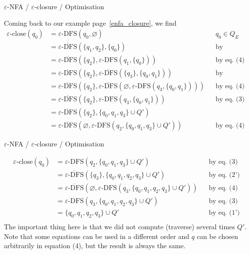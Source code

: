 \documentclass[compress,dvips,xcolor={dvipsnames},t]{beamer}
\newcommand\eNFA{\(\varepsilon\)-NFA\xspace}
\newcommand\eClose{\varepsilon\text{-close}}
\newcommand\eDFS{\varepsilon\text{-DFS}}
\newcommand\eDFSset{\overline{\varepsilon\text{-DFS}}}
\begin{document}
%
\begin{frame}{\eNFA{} / \(\varepsilon\)-closure / Optimisation}

Coming back to our example page~\ref{enfa_closure}, we find
\begin{align*}
   \eClose (q_0)
&= \eDFS (q_0, \varnothing)
&& q_0 \in Q_E\\
&= \eDFSset (\{q_1, q_2\}, \{q_0\})
&& \text{by eq.~(2')}\\
&= \eDFSset (\{q_2\}, \eDFS (q_1, \{q_0\}))
&& \text{by eq.~(4)}\\
&= \eDFSset (\{q_2\}, \eDFSset (\{q_3\}, \{q_0,
   q_1\}))
&& \text{by eq.~(2')}\\
&= \eDFSset (\{q_2\}, \eDFSset (\varnothing, \eDFS (q_3, \{q_0, q_1\})))
&& \text{by eq.~(4)}\\
&= \eDFSset (\{q_2\}, \eDFS (q_3, \{q_0, q_1\}))
&& \text{by eq.~(3)}\\
&= \eDFSset (\{q_2\}, \{q_0, q_1, q_3\} \cup Q')\\
&= \eDFSset (\varnothing, \eDFS (q_2, \{q_0, q_1, q_3\} \cup Q'))
&& \text{by eq.~(4)}
\end{align*}

\end{frame}

%
\begin{frame}{\eNFA{} / \(\varepsilon\)-closure / Optimisation}

\begin{align*}
   \eClose (q_0)
&= \eDFS (q_2, \{q_0, q_1, q_3\} \cup Q')
&& \text{by eq.~(3)}\\
&= \eDFSset (\{q_3\}, \{q_0, q_1, q_2, q_3\} \cup Q')
&& \text{by eq.~(2')}\\
&= \eDFSset (\varnothing, \eDFS (q_3, \{q_0, q_1, q_2, q_3\} \cup Q'))
&& \text{by eq.~(4)}\\
&= \eDFS (q_3, \{q_0, q_1, q_2, q_3\} \cup Q')
&& \text{by eq.~(3)}\\
&= \{q_0, q_1, q_2, q_3\} \cup Q'
&& \text{by eq.~(1')}\\
\end{align*}
The important thing here is that we did not compute (traverse) several
times \(Q'\). Note that some equations can be used in a different
order and \(q\) can be chosen arbitrarily in equation (4), but the
result is always the same.

\end{frame}
\end{document}
